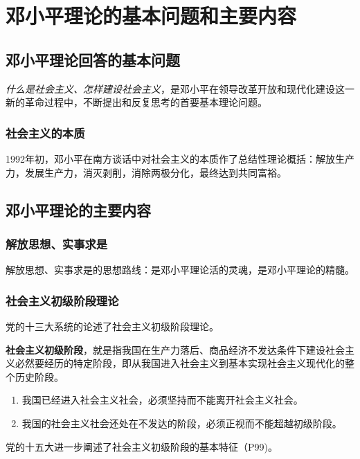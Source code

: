 \section{邓小平理论的基本问题和主要内容}
    \subsection{邓小平理论回答的基本问题}
        \emph{什么是社会主义、怎样建设社会主义}，是邓小平在领导改革开放和现代化建设这一新的革命过程中，不断提出和反复思考的首要基本理论问题。

    \subsubsection{社会主义的本质} 1992年初，邓小平在南方谈话中对社会主义的本质作了总结性理论概括：解放生产力，发展生产力，消灭剥削，消除两极分化，最终达到共同富裕。

    \subsection{邓小平理论的主要内容}
        \subsubsection{解放思想、实事求是} 解放思想、实事求是的思想路线：是邓小平理论活的灵魂，是邓小平理论的精髓。

        \subsubsection{社会主义初级阶段理论} 
        党的十三大系统的论述了社会主义初级阶段理论。

        \textbf{社会主义初级阶段}，就是指我国在生产力落后、商品经济不发达条件下建设社会主义必然要经历的特定阶段，即从我国进入社会主义到基本实现社会主义现代化的整个历史阶段。
        \begin{enumerate}
            \item 我国已经进入社会主义社会，必须坚持而不能离开社会主义社会。
            \item 我国的社会主义社会还处在不发达的阶段，必须正视而不能超越初级阶段。
        \end{enumerate}

        党的十五大进一步阐述了社会主义初级阶段的基本特征（P99)。

